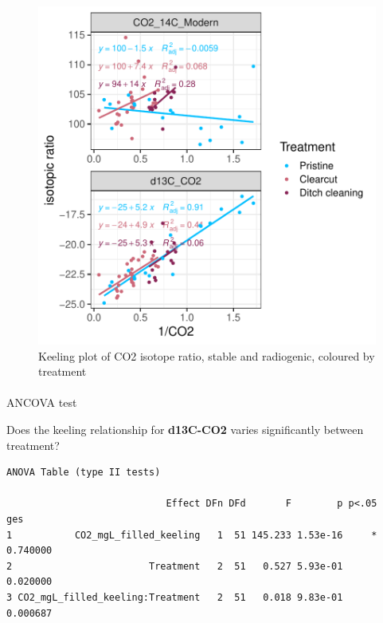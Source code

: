\documentclass[
]{article}
\makeatletter
\let\oldparagraph\paragraph
\renewcommand{\paragraph}{
    \@ifstar
      \xxxParagraphStar
      \xxxParagraphNoStar
  }
\newcommand{\xxxParagraphStar}[1]{\oldparagraph*{#1}\mbox{}}
\newcommand{\xxxParagraphNoStar}[1]{\oldparagraph{#1}\mbox{}}
\makeatother
\begin{document}
\begin{figure}[H]

{\centering \includegraphics{index_files/figure-pdf/unnamed-chunk-17-1.pdf}

}

\caption{Keeling plot of CO2 isotope ratio, stable and radiogenic,
coloured by treatment}

\end{figure}%

\paragraph{ANCOVA test}\label{ancova-test-3}

Does the keeling relationship for \textbf{d13C-CO2} varies significantly
between treatment?

\begin{verbatim}
ANOVA Table (type II tests)

                            Effect DFn DFd       F        p p<.05      ges
1           CO2_mgL_filled_keeling   1  51 145.233 1.53e-16     * 0.740000
2                        Treatment   2  51   0.527 5.93e-01       0.020000
3 CO2_mgL_filled_keeling:Treatment   2  51   0.018 9.83e-01       0.000687
\end{verbatim}
\end{document}
